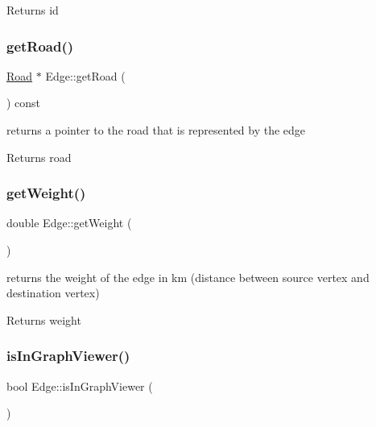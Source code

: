 \begin{DoxyReturn}{Returns}
id 
\end{DoxyReturn}
\hypertarget{class_edge_ae967ccaa1db4dba903ccfb3c55be9bc5}{}\label{class_edge_ae967ccaa1db4dba903ccfb3c55be9bc5} 
\subsubsection{\texorpdfstring{get\+Road()}{getRoad()}}
{\footnotesize\ttfamily \hyperlink{class_road}{Road} $\ast$ Edge\+::get\+Road (\begin{DoxyParamCaption}{ }\end{DoxyParamCaption}) const}



returns a pointer to the road that is represented by the edge 

\begin{DoxyReturn}{Returns}
road 
\end{DoxyReturn}
\hypertarget{class_edge_a3a776c1ccafacdbdb10fdedd9cb329af}{}\label{class_edge_a3a776c1ccafacdbdb10fdedd9cb329af} 
\subsubsection{\texorpdfstring{get\+Weight()}{getWeight()}}
{\footnotesize\ttfamily double Edge\+::get\+Weight (\begin{DoxyParamCaption}{ }\end{DoxyParamCaption})}



returns the weight of the edge in km (distance between source vertex and destination vertex) 

\begin{DoxyReturn}{Returns}
weight 
\end{DoxyReturn}
\hypertarget{class_edge_ad62dd3ff18f1f29d1281625287db21ee}{}\label{class_edge_ad62dd3ff18f1f29d1281625287db21ee} 
\subsubsection{\texorpdfstring{is\+In\+Graph\+Viewer()}{isInGraphViewer()}}
{\footnotesize\ttfamily bool Edge\+::is\+In\+Graph\+Viewer (\begin{DoxyParamCaption}{ }\end{DoxyParamCaption})}



